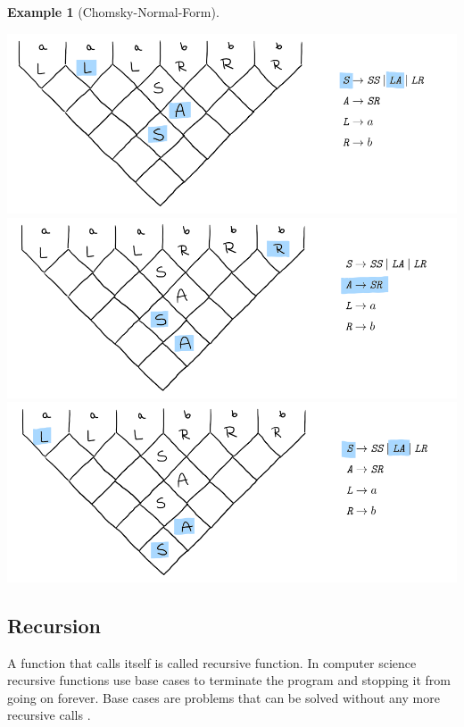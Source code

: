 \documentclass[a4paper, 11pt]{article}
\newtheorem*{example*}{Example}
\begin{document}
\begin{example*}[Chomsky-Normal-Form]
\begin{center}
\includegraphics[scale=0.9]{images/3.png} \\
\includegraphics[scale=0.9]{images/2.png} \\
\includegraphics[scale=0.9]{images/1.png} \\
\end{center}

\end{example*}




\subsection{Recursion}
\label{recursion}

A function that calls itself is called recursive function. In computer science recursive functions use base cases to terminate the program and stopping it from going on forever. Base cases are problems that can be solved without any more recursive calls \cite{recursion}.
\end{document}
